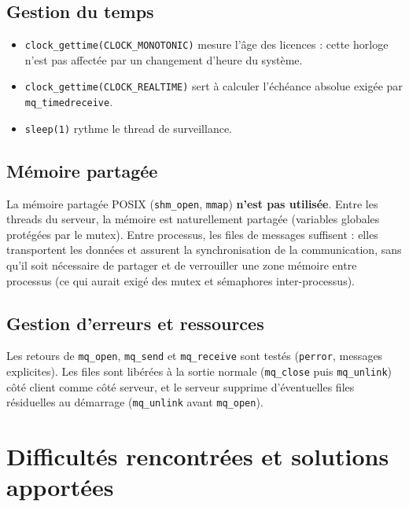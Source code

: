 \documentclass[11pt,a4paper]{article}
\newcommand{\code}[1]{\texttt{#1}}
\begin{document}
\subsection{Gestion du temps}

\begin{itemize}
  \item \code{clock\_gettime(CLOCK\_MONOTONIC)} mesure l'âge des licences : cette horloge n'est pas affectée par un changement d'heure du système.
  \item \code{clock\_gettime(CLOCK\_REALTIME)} sert à calculer l'échéance absolue exigée par \code{mq\_timedreceive}.
  \item \code{sleep(1)} rythme le thread de surveillance.
\end{itemize}

\subsection{Mémoire partagée}

La mémoire partagée POSIX (\code{shm\_open}, \code{mmap}) \textbf{n'est pas utilisée}. Entre les threads du serveur, la mémoire est naturellement partagée (variables globales protégées par le mutex). Entre processus, les files de messages suffisent : elles transportent les données et assurent la synchronisation de la communication, sans qu'il soit nécessaire de partager et de verrouiller une zone mémoire entre processus (ce qui aurait exigé des mutex et sémaphores inter-processus).

\subsection{Gestion d'erreurs et ressources}

Les retours de \code{mq\_open}, \code{mq\_send} et \code{mq\_receive} sont testés (\code{perror}, messages explicites). Les files sont libérées à la sortie normale (\code{mq\_close} puis \code{mq\_unlink}) côté client comme côté serveur, et le serveur supprime d'éventuelles files résiduelles au démarrage (\code{mq\_unlink} avant \code{mq\_open}).

\section{Difficultés rencontrées et solutions apportées}
\label{sec:difficultes}
\end{document}
